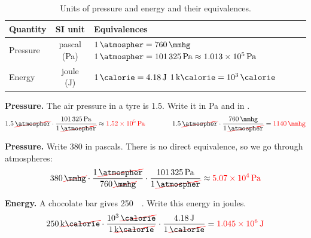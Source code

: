 \begin{table}[H]
    \centering
    \renewcommand{\arraystretch}{1.4}
    \begin{tabular}{lcp{6.5cm}}
        \toprule
        \textbf{Quantity} & \textbf{SI unit} & \textbf{Equivalences} \\
        \midrule
        Pressure & pascal (\unit{\Pa}) & \(\qty{1}{\atmospher} = \qty{760}{\mmhg}\) \newline \(\qty{1}{\atmospher} = \qty{101325}{\Pa} \approx \qty{1.013e5}{\Pa}\) \\
        Energy & joule (\unit{\J}) & \(\qty{1}{\calorie} = \qty{4.18}{\J}\) \newline \(\qty{1}{\kilo\calorie} = \qty{e3}{\calorie}\) \\
        \bottomrule
    \end{tabular}
    \caption{Units of pressure and energy and their equivalences.}
    \label{tab:u1_pressure_energy}
\end{table}

\begin{example}
    \textbf{Pressure.} The air pressure in a tyre is \qty{1.5}{\atmospher}. Write it in \unit{\Pa} and in \unit{\mmhg}.
    \begin{equation*}
        \num{1.5}\,\cancelunit{\atmospher} \cdot \dfrac{\qty{101325}{\Pa}}{1\,\cancelunit{\atmospher}} \approx \textcolor{red}{\qty{1.52e5}{\Pa}}
        \qquad\qquad
        \num{1.5}\,\cancelunit{\atmospher} \cdot \dfrac{\qty{760}{\mmhg}}{1\,\cancelunit{\atmospher}} = \textcolor{red}{\qty{1140}{\mmhg}}
    \end{equation*}
\end{example}

\begin{example}
    \textbf{Pressure.} Write \qty{380}{\mmhg} in pascals. There is no direct equivalence, so we go through atmospheres:
    \begin{equation*}
        \num{380}\,\cancelunit{\mmhg} \cdot \dfrac{1\,\cancelunit{\atmospher}}{\num{760}\,\cancelunit{\mmhg}} \cdot \dfrac{\qty{101325}{\Pa}}{1\,\cancelunit{\atmospher}} \approx \textcolor{red}{\qty{5.07e4}{\Pa}}
    \end{equation*}
\end{example}

\begin{example}
    \textbf{Energy.} A chocolate bar gives \qty{250}{\kilo\calorie}. Write this energy in joules.
    \begin{equation*}
        \num{250}\,\cancelunit{\kilo\calorie} \cdot \dfrac{\num{e3}\,\cancelunit{\calorie}}{1\,\cancelunit{\kilo\calorie}} \cdot \dfrac{\qty{4.18}{\J}}{1\,\cancelunit{\calorie}} = \textcolor{red}{\qty{1.045e6}{\J}}
    \end{equation*}
\end{example}

